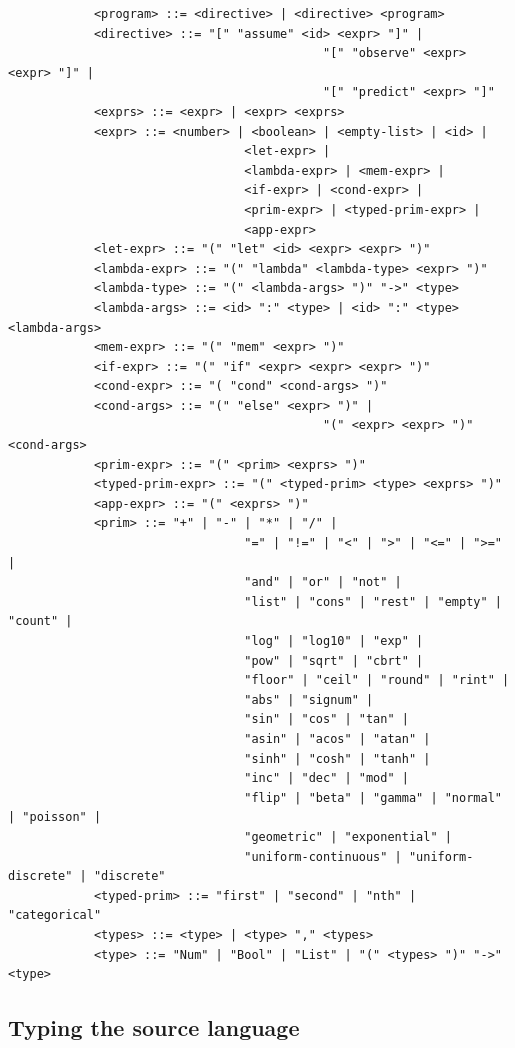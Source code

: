 \documentclass[a4paper]{article}
\begin{document}
\begin{center}
	\begin{varwidth}{\linewidth}
		\small
		\begin{verbatim}
			<program> ::= <directive> | <directive> <program>
			<directive> ::= "[" "assume" <id> <expr> "]" |
											"[" "observe" <expr> <expr> "]" |
											"[" "predict" <expr> "]"
			<exprs> ::= <expr> | <expr> <exprs>
			<expr> ::= <number> | <boolean> | <empty-list> | <id> |
								 <let-expr> |
								 <lambda-expr> | <mem-expr> |
								 <if-expr> | <cond-expr> |
								 <prim-expr> | <typed-prim-expr> |
								 <app-expr>
			<let-expr> ::= "(" "let" <id> <expr> <expr> ")"
			<lambda-expr> ::= "(" "lambda" <lambda-type> <expr> ")"
			<lambda-type> ::= "(" <lambda-args> ")" "->" <type>
			<lambda-args> ::= <id> ":" <type> | <id> ":" <type> <lambda-args>
			<mem-expr> ::= "(" "mem" <expr> ")"
			<if-expr> ::= "(" "if" <expr> <expr> <expr> ")"
			<cond-expr> ::= "( "cond" <cond-args> ")"
			<cond-args> ::= "(" "else" <expr> ")" |
											"(" <expr> <expr> ")" <cond-args>
			<prim-expr> ::= "(" <prim> <exprs> ")"
			<typed-prim-expr> ::= "(" <typed-prim> <type> <exprs> ")"
			<app-expr> ::= "(" <exprs> ")"
			<prim> ::= "+" | "-" | "*" | "/" |
								 "=" | "!=" | "<" | ">" | "<=" | ">=" |
								 "and" | "or" | "not" |
								 "list" | "cons" | "rest" | "empty" | "count" |
								 "log" | "log10" | "exp" |
								 "pow" | "sqrt" | "cbrt" |
								 "floor" | "ceil" | "round" | "rint" |
								 "abs" | "signum" |
								 "sin" | "cos" | "tan" |
								 "asin" | "acos" | "atan" |
								 "sinh" | "cosh" | "tanh" |
								 "inc" | "dec" | "mod" |
								 "flip" | "beta" | "gamma" | "normal" | "poisson" |
								 "geometric" | "exponential" |
								 "uniform-continuous" | "uniform-discrete" | "discrete"
			<typed-prim> ::= "first" | "second" | "nth" | "categorical"
			<types> ::= <type> | <type> "," <types>
			<type> ::= "Num" | "Bool" | "List" | "(" <types> ")" "->" <type>
		\end{verbatim}
	\end{varwidth}
\end{center}




\subsection{Typing the source language}
\end{document}
